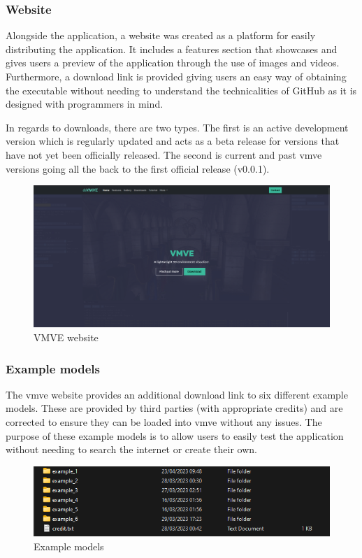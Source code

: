 \documentclass[11pt]{article}
\begin{document}
\subsubsection{Website}
Alongside the application, a website was created as a platform for easily
distributing the application. It includes a features section that showcases and
gives users a preview of the application through the use of images and videos.
Furthermore, a download link is provided giving users an easy way of obtaining
the executable without needing to understand the technicalities of GitHub as it
is designed with programmers in mind.

In regards to downloads, there are two types. The first is an active development
version which is regularly updated and acts as a beta release for versions that
have not yet been officially released. The second is current and past
\gls*{vmve} versions going all the back to the first official release (v0.0.1).

\begin{figure}[H]
  \centering
  \includegraphics[width=\textwidth]{images/website.png}
  \caption{VMVE website}
  \label{fig:website}
\end{figure}


\subsubsection{Example models}
The \gls*{vmve} website provides an additional download link to six different
example models. These are provided by third parties (with appropriate credits)
and are corrected to ensure they can be loaded into \gls*{vmve} without any
issues. The purpose of these example models is to allow users to easily test the
application without needing to search the internet or create their own.

\begin{figure}[H]
  \centering
  \includegraphics[width=\textwidth]{images/example_models.png}
  \caption{Example models}
  \label{fig:example_models}
\end{figure}
\end{document}
